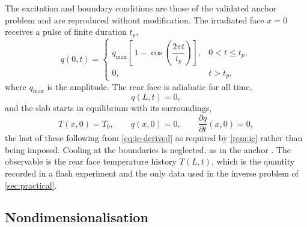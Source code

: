 \documentclass[preprint,12pt,a4paper]{elsarticle}
\theoremstyle{plain}
\theoremstyle{definition}
\theoremstyle{remark}
\begin{document}
The excitation and boundary conditions are those of the validated anchor
problem \cite{Kovacs2018} and are reproduced without modification. The
irradiated face $x=0$ receives a pulse of finite duration $t_{p}$,
%
\begin{equation}
  q(0,t) =
  \begin{cases}
    q_{\max}\left[\,1 - \cos\!\left(\dfrac{2\pi t}{t_{p}}\right)\right],
      & 0 < t \leq t_{p}, \\[2ex]
    0, & t > t_{p},
  \end{cases}
  \label{eq:pulse}
\end{equation}
%
where $q_{\max}$ is the amplitude. The rear face is adiabatic for all time,
%
\begin{equation}
  q(L,t) = 0 ,
  \label{eq:bc-rear}
\end{equation}
%
and the slab starts in equilibrium with its surroundings,
%
\begin{equation}
  T(x,0) = T_{0}, \qquad q(x,0) = 0,
  \qquad \frac{\partial q}{\partial t}(x,0) = 0 ,
  \label{eq:ic}
\end{equation}
%
the last of these following from \eqref{eq:ic-derived} as required by
\cref{rem:ic} rather than being imposed. Cooling at the boundaries is
neglected, as in the anchor \cite{Kovacs2018}. The observable is the rear face
temperature history $T(L,t)$, which is the quantity recorded in a flash
experiment and the only data used in the inverse problem of
\cref{sec:practical}.


\subsection{Nondimensionalisation}
\label{sec:model-nondim}
\end{document}
